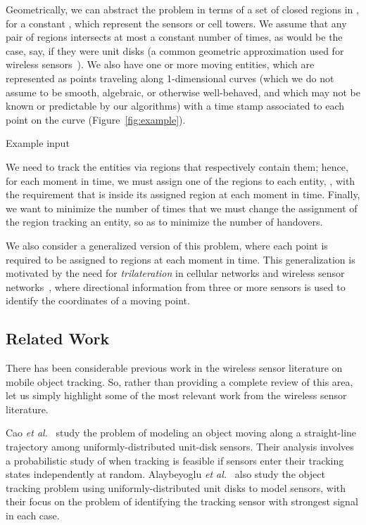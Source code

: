 \documentclass[runningheads]{llncs}
\begin{document}
Geometrically, we can abstract the problem in terms of a set of  closed regions in , for a constant , which represent the sensors or cell towers.
We assume that any pair of regions 
intersects at most a constant number of times, as would be the case,
say, if they were unit disks (a common geometric
approximation used for wireless 
sensors~\cite{aekd-tfmt-10,cysa-atdp-05,gtzts-stpea-10,hh-ttqw-05,ppk-eqttt-03,zjr-iddsc-02}).
We also have one or more moving entities,
which are represented as points traveling along 1-dimensional curves (which we do not assume to  be smooth, algebraic, or otherwise well-behaved, and which may not be known or predictable by our algorithms) with a time stamp 
associated to each point on the curve (Figure~\ref{fig:example}).

   {\label{fig:example} Example input}

We need to track the entities via regions that respectively contain them; 
hence, for each moment in time, 
we must assign one of the regions to each entity, ,
with the requirement that  is 
inside its assigned region at each moment in time. 
Finally,
we want to minimize the number of 
times that we must change
the assignment of the region tracking an entity, so as to minimize
the number of handovers.

We also consider a generalized version of this problem, where
each point  is required to be assigned to  regions at each 
moment in time.
This generalization is motivated by the need for 
\emph{trilateration} in cellular networks and wireless sensor 
networks~\cite{hellebrandt2002estimating,yl-qtcbi-10},
where directional information from three or more 
sensors is used to identify the coordinates of a moving point.
  
\subsection{Related Work}
There has been considerable previous work in the wireless sensor
literature on mobile object tracking. So, rather than providing a
complete review of this area, let us simply highlight some of the
most relevant work from the wireless sensor literature.

Cao {\it et al.}~\cite{cysa-atdp-05} study 
the problem of modeling an object moving along a straight-line
trajectory among uniformly-distributed 
unit-disk sensors. Their analysis involves a
probabilistic study of when tracking is feasible if sensors enter their
tracking states independently at random.
Alaybeyoglu {\it et al.}~\cite{aekd-tfmt-10}
also study the object tracking problem using uniformly-distributed 
unit disks to model sensors,
with their focus on the problem of identifying the tracking sensor
with strongest signal in each case.
\end{document}
